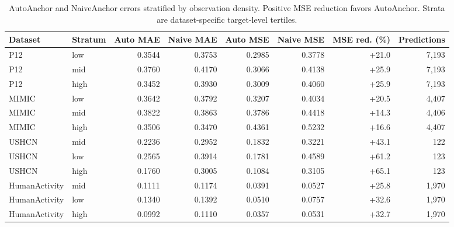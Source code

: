 \begin{table}[t]
\caption{AutoAnchor and NaiveAnchor errors stratified by observation density. Positive MSE reduction favors AutoAnchor. Strata are dataset-specific target-level tertiles.}
\label{tab:anchor-density-strata}
\centering
\scriptsize
\begin{tabular}{llrrrrrr}
\toprule
Dataset & Stratum & Auto MAE & Naive MAE & Auto MSE & Naive MSE & MSE red. (\%) & Predictions \\
\midrule
P12 & low & 0.3544 & 0.3753 & 0.2985 & 0.3778 & +21.0 & 7,193 \\
P12 & mid & 0.3760 & 0.4170 & 0.3066 & 0.4138 & +25.9 & 7,193 \\
P12 & high & 0.3452 & 0.3930 & 0.3009 & 0.4060 & +25.9 & 7,193 \\
MIMIC & low & 0.3642 & 0.3792 & 0.3207 & 0.4034 & +20.5 & 4,407 \\
MIMIC & mid & 0.3822 & 0.3863 & 0.3786 & 0.4418 & +14.3 & 4,406 \\
MIMIC & high & 0.3506 & 0.3470 & 0.4361 & 0.5232 & +16.6 & 4,407 \\
USHCN & mid & 0.2236 & 0.2952 & 0.1832 & 0.3221 & +43.1 & 122 \\
USHCN & low & 0.2565 & 0.3914 & 0.1781 & 0.4589 & +61.2 & 123 \\
USHCN & high & 0.1760 & 0.3005 & 0.1084 & 0.3105 & +65.1 & 123 \\
HumanActivity & mid & 0.1111 & 0.1174 & 0.0391 & 0.0527 & +25.8 & 1,970 \\
HumanActivity & low & 0.1340 & 0.1392 & 0.0510 & 0.0757 & +32.6 & 1,970 \\
HumanActivity & high & 0.0992 & 0.1110 & 0.0357 & 0.0531 & +32.7 & 1,970 \\
\bottomrule
\end{tabular}
\end{table}
